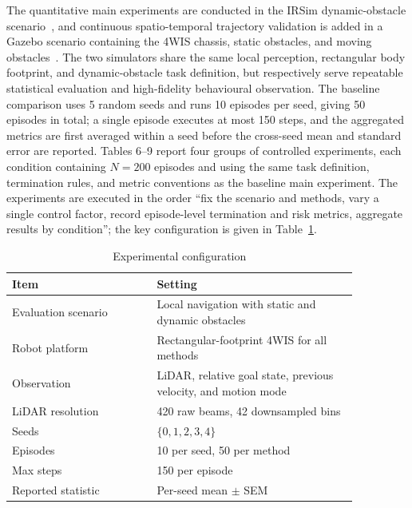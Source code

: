 \documentclass[10pt,a4paper,twocolumn]{article}
\begin{document}
The quantitative main experiments are conducted in the IRSim dynamic-obstacle scenario~\cite{irsim}, and continuous spatio-temporal trajectory validation is added in a Gazebo scenario containing the 4WIS chassis, static obstacles, and moving obstacles~\cite{koenig2004gazebo}. The two simulators share the same local perception, rectangular body footprint, and dynamic-obstacle task definition, but respectively serve repeatable statistical evaluation and high-fidelity behavioural observation. The baseline comparison uses 5 random seeds and runs 10 episodes per seed, giving 50 episodes in total; a single episode executes at most 150 steps, and the aggregated metrics are first averaged within a seed before the cross-seed mean and standard error are reported. Tables 6--9 report four groups of controlled experiments, each condition containing $N=200$ episodes and using the same task definition, termination rules, and metric conventions as the baseline main experiment. The experiments are executed in the order ``fix the scenario and methods, vary a single control factor, record episode-level termination and risk metrics, aggregate results by condition''; the key configuration is given in Table~\ref{tab:exp_config}.

\begin{table}[H]
    \centering

    \caption{Experimental configuration}
    \label{tab:exp_config}
    \scriptsize

    \begin{tabular}
{p{0.36\linewidth}p{0.50\linewidth}}
        \toprule

        Item & Setting \\
        \midrule

        Evaluation scenario & Local navigation with static and dynamic obstacles \\
        Robot platform & Rectangular-footprint 4WIS for all methods \\
        Observation & LiDAR, relative goal state, previous velocity, and motion mode \\
        LiDAR resolution & 420 raw beams, 42 downsampled bins \\
        Seeds & $\{0,1,2,3,4\}$ \\
        Episodes & 10 per seed, 50 per method \\
        Max steps & 150 per episode \\
        Reported statistic & Per-seed mean $\pm$ SEM \\
        \bottomrule

    
\end{tabular}
\end{table}
\end{document}

